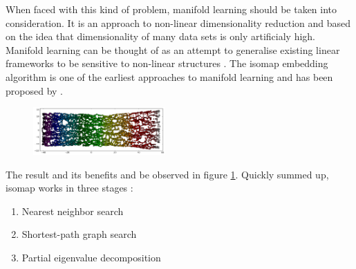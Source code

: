 \vspace{-2mm}
\noindent When faced with this kind of problem, manifold learning should be taken into consideration.
It is an approach to non-linear dimensionality reduction and based on the idea that dimensionality of many data sets is only artificialy high.
Manifold learning can be thought of as an attempt to generalise existing linear frameworks to be sensitive to non-linear structures \cite{scikit-learn}.
The isomap embedding algorithm is one of the earliest approaches to manifold learning and has been proposed by .

\begin{figure}
	\centering
	\includegraphics[width=0.45\textwidth]{external_content/graphs/swiss_roll-manifold.png}
	\captionsetup{justification=centering}
	\label{fig:swissrollmanifold}
\end{figure}

\noindent
The result and its benefits and be observed in figure \ref{fig:swissrollmanifold}.
Quickly summed up, isomap works in three stages \cite{scikit-learn}:

\begin{enumerate}
	\vspace{-2mm}
	\item Nearest neighbor search
	\vspace{-2mm}
	\item Shortest-path graph search
	\vspace{-2mm}
	\item Partial eigenvalue decomposition
\end{enumerate}





